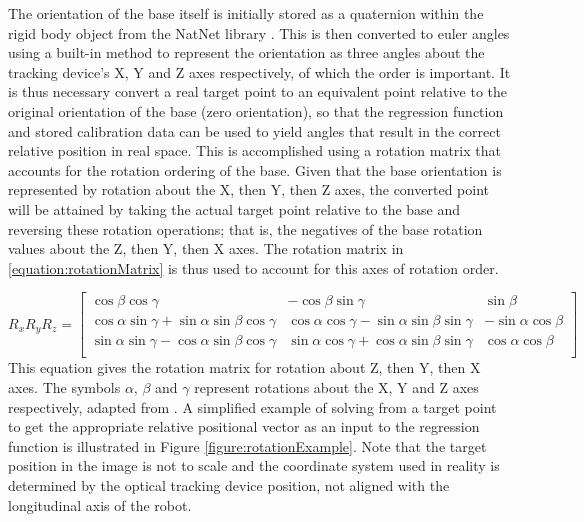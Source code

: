 \documentclass[11pt]{article}
\begin{document}
The orientation of the base itself is initially stored as a quaternion within the rigid body object from the NatNet library \cite{natnet2016}. This is then converted to euler angles using a built-in method to represent the orientation as three angles about the tracking device's X, Y and Z axes respectively, of which the order is important. It is thus necessary convert a real target point to an equivalent point relative to the original orientation of the base (zero orientation), so that the regression function and stored calibration data can be used to yield angles that result in the correct relative position in real space. This is accomplished using a rotation matrix that accounts for the rotation ordering of the base. Given that the base orientation is represented by rotation about the X, then Y, then Z axes, the converted point will be attained by taking the actual target point relative to the base and reversing these rotation operations; that is, the negatives of the base rotation values about the Z, then Y, then X axes. The rotation matrix in \eqref{equation:rotationMatrix} is thus used to account for this axes of rotation order. 

\begin{equation}\label{equation:rotationMatrix}
R_{x}R_{y}R_{z} = 
\begin{bmatrix*}
\cos\beta\cos\gamma & -\cos\beta\sin\gamma & \sin\beta \\
\cos\alpha\sin\gamma + \sin\alpha\sin\beta\cos\gamma & \cos\alpha\cos\gamma - \sin\alpha\sin\beta\sin\gamma & -\sin\alpha\cos\beta \\
\sin\alpha\sin\gamma - \cos\alpha\sin\beta\cos\gamma & \sin\alpha\cos\gamma + \cos\alpha\sin\beta\sin\gamma & \cos\alpha\cos\beta \\
\end{bmatrix*}
\end{equation}
This equation gives the rotation matrix for rotation about Z, then Y, then X axes. The symbols $\alpha$, $\beta$ and $\gamma$ represent rotations about the X, Y and Z axes respectively, adapted from \cite{3drotation}. A simplified example of solving from a target point to get the appropriate relative positional vector as an input to the regression function is illustrated in Figure \ref{figure:rotationExample}. Note that the target position in the image is not to scale and the coordinate system used in reality is determined by the optical tracking device position, not aligned with the longitudinal axis of the robot. 
\end{document}
